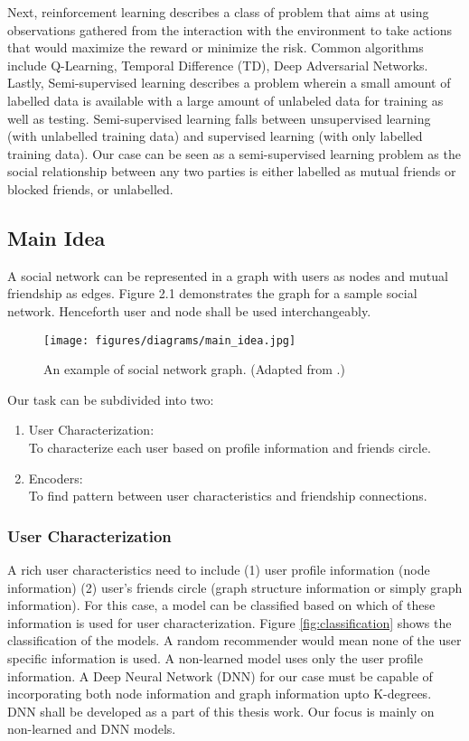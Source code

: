 \documentclass{kththesis}
\begin{document}
Next, reinforcement learning describes a class of problem that aims at using observations gathered from the interaction with the environment to take actions that would maximize the reward or minimize the risk. Common algorithms include Q-Learning, Temporal Difference (TD), Deep Adversarial Networks. Lastly, Semi-supervised learning describes a problem wherein a small amount of labelled data is available with a large amount of unlabeled data for training as well as testing. Semi-supervised learning falls between unsupervised learning (with unlabelled training data) and supervised learning (with only labelled training data). Our case can be seen as a semi-supervised learning problem as the social relationship between any two parties is either labelled as mutual friends or blocked friends, or unlabelled. 
\subsection{Main Idea}
A social network can be represented in a graph with users as nodes and mutual friendship as edges. Figure 2.1 demonstrates the graph for a sample social network. Henceforth user and node shall be used interchangeably. 

\begin{figure}[h!] %
\centering
\captionsetup{justification=centering}
\texttt{[image: figures/diagrams/main\_idea.jpg]}
\caption{An example of social network graph. (Adapted from \cite{PinSage}.)}
\label{fig:mainflow}
\end{figure}

\newpage

\noindent Our task can be subdivided into two: 
\begin{enumerate}
  \item User Characterization:\\
  To characterize each user based on profile information and friends circle. 
  \item Encoders: \\
  To find pattern between user characteristics and friendship connections.
\end{enumerate}

\subsubsection{User Characterization}
\noindent A rich user characteristics need to include (1) user profile information (node information) (2) user's friends circle (graph structure information or simply graph information). For this case, a model can be classified based on which of these information is used for user characterization. Figure \ref{fig:classification} shows the classification of the models. A random recommender would mean none of the user specific information is used. A non-learned model uses only the user profile information. A Deep Neural Network (DNN) for our case must be capable of incorporating both node information and graph information upto K-degrees. DNN shall be developed as a part of this thesis work. Our focus is mainly on non-learned and DNN models. \\
\end{document}
